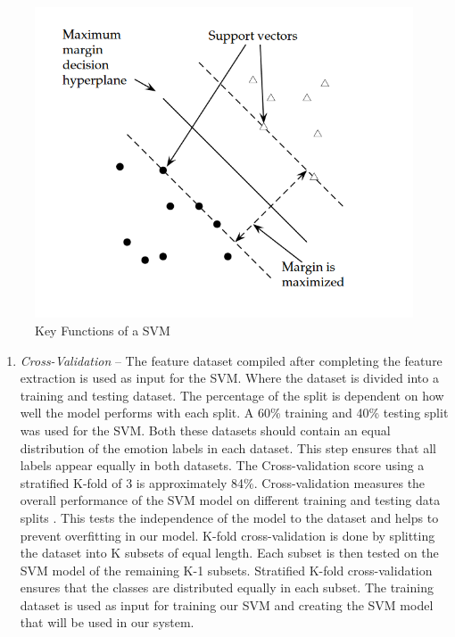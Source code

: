 \begin{enumerate}
\begin{figure}[H]
  \centering
  \includegraphics[scale=0.6]{svm}
  \caption{Key Functions of a SVM \cite{stan}}
  \label{fig: svm}
\end{figure} 





\begin{enumerate}
\item\textit{Cross-Validation} -- The feature dataset compiled after completing the feature extraction is used as input for the SVM. Where the dataset is divided into a training and testing dataset. The percentage of the split is dependent on how well the model performs with each split. A 60\% training and 40\% testing split was used for the SVM. Both these datasets should contain an equal distribution of the emotion labels in each dataset. This step ensures that all labels appear equally in both datasets. The Cross-validation score using a stratified K-fold of 3 is approximately 84\%. Cross-validation measures the overall performance of the SVM model on different training and testing data splits \cite{svm}. This tests the independence of the model to the dataset and helps to prevent overfitting in our model. K-fold cross-validation is done by splitting the dataset into K subsets of equal length. Each subset is then tested on the SVM model of the remaining K-1 subsets. Stratified K-fold cross-validation ensures that the classes are distributed equally in each subset. The training dataset is used as input for training our SVM and creating the SVM model that will be used in our system.\\


\end{enumerate}
\end{enumerate}
